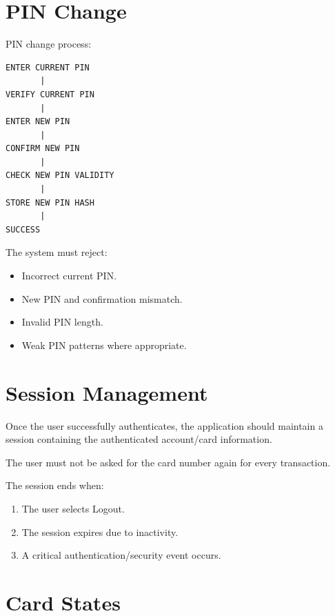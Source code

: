 \documentclass[12pt,a4paper]{article}
\begin{document}
\section{PIN Change}

PIN change process:

\begin{verbatim}
ENTER CURRENT PIN
       |
VERIFY CURRENT PIN
       |
ENTER NEW PIN
       |
CONFIRM NEW PIN
       |
CHECK NEW PIN VALIDITY
       |
STORE NEW PIN HASH
       |
SUCCESS
\end{verbatim}

The system must reject:

\begin{itemize}
    \item Incorrect current PIN.
    \item New PIN and confirmation mismatch.
    \item Invalid PIN length.
    \item Weak PIN patterns where appropriate.
\end{itemize}


\section{Session Management}

Once the user successfully authenticates, the application should maintain
a session containing the authenticated account/card information.

The user must not be asked for the card number again for every transaction.

The session ends when:

\begin{enumerate}
    \item The user selects Logout.
    \item The session expires due to inactivity.
    \item A critical authentication/security event occurs.
\end{enumerate}


\section{Card States}
\end{document}
